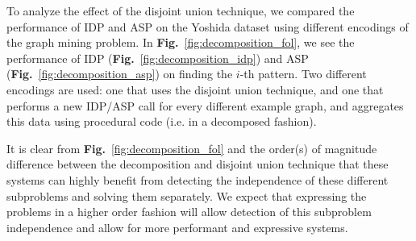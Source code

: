 To analyze the effect of the disjoint union technique, we compared the performance of IDP and ASP on the Yoshida dataset using different encodings of the graph mining problem.
In \textbf{Fig.}~\ref{fig:decomposition_fol}, we see the performance of IDP (\textbf{Fig.}~\ref{fig:decomposition_idp}) and ASP (\textbf{Fig.}~\ref{fig:decomposition_asp}) on finding the $i$-th pattern.
Two different encodings are used: one that uses the disjoint union technique, and one that performs a new IDP/ASP call for every different example graph, and aggregates this data using procedural code (i.e. in a decomposed fashion).

It is clear from \textbf{Fig.}~\ref{fig:decomposition_fol} and the order(s) of magnitude difference between the decomposition and disjoint union technique that these systems can highly benefit from detecting the independence of these different subproblems and solving them separately.
We expect that expressing the problems in a higher order fashion will allow detection of this subproblem independence and allow for more performant and expressive systems.
